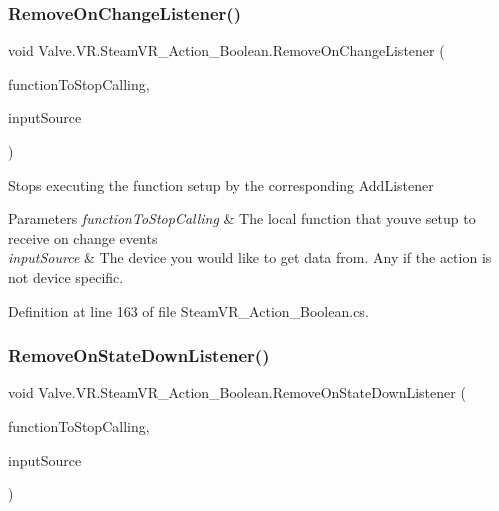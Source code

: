 \subsubsection{\texorpdfstring{RemoveOnChangeListener()}{RemoveOnChangeListener()}}
{\footnotesize\ttfamily void Valve.\+V\+R.\+Steam\+V\+R\+\_\+\+Action\+\_\+\+Boolean.\+Remove\+On\+Change\+Listener (\begin{DoxyParamCaption}\item[{\mbox{\hyperlink{class_valve_1_1_v_r_1_1_steam_v_r___action___boolean_a9dbdff089d05d822688005fa19fef120}{Change\+Handler}}}]{function\+To\+Stop\+Calling,  }\item[{\mbox{\hyperlink{namespace_valve_1_1_v_r_a82e5bf501cc3aa155444ee3f0662853f}{Steam\+V\+R\+\_\+\+Input\+\_\+\+Sources}}}]{input\+Source }\end{DoxyParamCaption})}



Stops executing the function setup by the corresponding Add\+Listener 


\begin{DoxyParams}{Parameters}
{\em function\+To\+Stop\+Calling} & The local function that you\textquotesingle{}ve setup to receive on change events\\
\hline
{\em input\+Source} & The device you would like to get data from. Any if the action is not device specific.\\
\hline
\end{DoxyParams}


Definition at line 163 of file Steam\+V\+R\+\_\+\+Action\+\_\+\+Boolean.\+cs.

\mbox{\label{class_valve_1_1_v_r_1_1_steam_v_r___action___boolean_af49585bef4b30cf01b02b65a31da5ea5}} 
\subsubsection{\texorpdfstring{RemoveOnStateDownListener()}{RemoveOnStateDownListener()}}
{\footnotesize\ttfamily void Valve.\+V\+R.\+Steam\+V\+R\+\_\+\+Action\+\_\+\+Boolean.\+Remove\+On\+State\+Down\+Listener (\begin{DoxyParamCaption}\item[{\mbox{\hyperlink{class_valve_1_1_v_r_1_1_steam_v_r___action___boolean_a529f46e4f0459edb2641bbb382d10614}{State\+Down\+Handler}}}]{function\+To\+Stop\+Calling,  }\item[{\mbox{\hyperlink{namespace_valve_1_1_v_r_a82e5bf501cc3aa155444ee3f0662853f}{Steam\+V\+R\+\_\+\+Input\+\_\+\+Sources}}}]{input\+Source }\end{DoxyParamCaption})}



